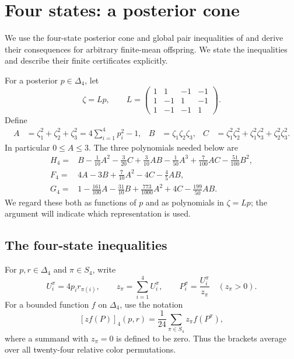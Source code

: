 
\section{Four states: a posterior cone}
\label{sec:four-state-cone}

We use the four-state posterior cone and global pair inequalities of \cite{OpenAI4} and derive their consequences for arbitrary finite-mean offspring. We state the inequalities and describe their finite certificates explicitly.

For a posterior $p\in\Delta_4$, let
\[
 \zeta=Lp,\qquad
 L=\begin{pmatrix}
  1&1&-1&-1\\
  1&-1&1&-1\\
  1&-1&-1&1
 \end{pmatrix}.
\]
Define
\begin{align}
 A&=\zeta_1^2+\zeta_2^2+\zeta_3^2
      =4\sum_{i=1}^4p_i^2-1,
 & B&=\zeta_1\zeta_2\zeta_3,
 & C&=\zeta_1^2\zeta_2^2+\zeta_1^2\zeta_3^2+
       \zeta_2^2\zeta_3^2.
 \label{eq:q4-basic-polynomials}
\end{align}
In particular $0\le A\le3$.  The three polynomials needed below are
\begin{align}
 H_4={}&B-\frac1{10}A^2-\frac3{20}C+\frac3{10}AB
       -\frac1{50}A^3+\frac7{100}AC-\frac{51}{100}B^2,
       \label{eq:q4-H}\\
 F_4={}&4A-3B+\frac7{10}A^2-4C-\frac45AB,
       \label{eq:q4-F}\\
 G_4={}&1-\frac{161}{100}A-\frac{31}{10}B
       +\frac{773}{1000}A^2+4C-\frac{199}{50}AB.
       \label{eq:q4-G}
\end{align}
We regard these both as functions of $p$ and as polynomials in $\zeta=Lp$;
the argument will indicate which representation is used.

\subsection{The four-state inequalities}

For $p,r\in\Delta_4$ and $\pi\in S_4$, write
\[
 U_i^\pi=4p_i r_{\pi(i)},\qquad
 z_\pi=\sum_{i=1}^4U_i^\pi,\qquad
 P_i^\pi=\frac{U_i^\pi}{z_\pi}\quad(z_\pi>0).
\]
For a bounded function $f$ on $\Delta_4$, use the notation
\[
 [zf(P)]_4(p,r)=\frac1{24}\sum_{\pi\in S_4}z_\pi f(P^\pi),
\]
where a summand with $z_\pi=0$ is defined to be zero.  Thus the brackets
average over all twenty-four relative color permutations.

